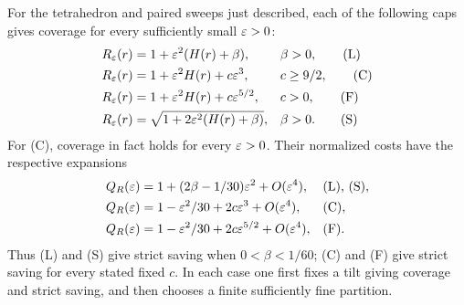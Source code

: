 \begin{proposition}\label{prop:cap-choices}
For the tetrahedron and paired sweeps just described, each of the
following caps gives coverage for every sufficiently small $\varepsilon>0$:
\begin{align*}
 R_\varepsilon(r)&=1+\varepsilon^2(H(r)+\beta), &&\beta>0,\tag{L}\\
 R_\varepsilon(r)&=1+\varepsilon^2H(r)+c\varepsilon^3, &&c\ge9/2,\tag{C}\\
 R_\varepsilon(r)&=1+\varepsilon^2H(r)+c\varepsilon^{5/2}, &&c>0,\tag{F}\\
 R_\varepsilon(r)&=\sqrt{1+2\varepsilon^2(H(r)+\beta)},&&\beta>0.\tag{S}
\end{align*}
For (C), coverage in fact holds for every $\varepsilon>0$.
Their normalized costs have the respective expansions
\begin{align}
 Q_R(\varepsilon)&=1+(2\beta-1/30)\varepsilon^2+O(\varepsilon^4), &&\text{(L), (S)},
 \label{eq:fixed-cap-cost}\\
 Q_R(\varepsilon)&=1-\varepsilon^2/30+2c\varepsilon^3+O(\varepsilon^4), &&\text{(C)},
 \label{eq:cubic-cap-cost}\\
 Q_R(\varepsilon)&=1-\varepsilon^2/30+2c\varepsilon^{5/2}+O(\varepsilon^4), &&\text{(F)}.
 \label{eq:fractional-cap-cost}
\end{align}
Thus (L) and (S) give strict saving when $0<\beta<1/60$;
(C) and (F) give strict saving for every stated fixed $c$.
In each case one first fixes a tilt giving coverage and strict saving,
and then chooses a finite sufficiently fine partition.
\end{proposition}
